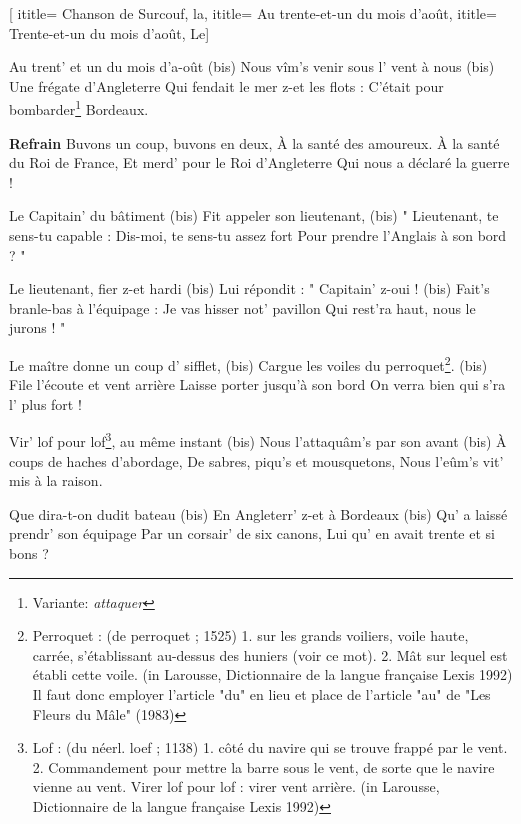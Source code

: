  [
ititle= {Chanson de Surcouf, la},
ititle= {Au trente-et-un du mois d'août},
ititle= {Trente-et-un du mois d'août, Le}]


\beginverse
Au trent' et un du mois d'a-oût (bis)
Nous vîm's venir sous l' vent à nous (bis)
Une frégate d'Angleterre
Qui fendait le mer z-et les flots :
C'était pour bombarder\footnote {Variante: \emph{attaquer}} Bordeaux.
\endverse

\beginchorus
\textbf {Refrain}
Buvons un coup, buvons en deux,
À la santé des amoureux.
À la santé du Roi de France,
Et merd' pour le Roi d'Angleterre
Qui nous a déclaré la guerre !
\endchorus

\beginverse
Le Capitain' du bâtiment (bis)
Fit appeler son lieutenant, (bis)
" Lieutenant, te sens-tu capable :
Dis-moi, te sens-tu assez fort
Pour prendre l'Anglais à son bord ? "
\endverse

\beginverse
Le lieutenant, fier z-et hardi (bis)
Lui répondit : " Capitain' z-oui ! (bis)
Fait's branle-bas à l'équipage :
Je vas hisser not' pavillon
Qui rest'ra haut, nous le jurons ! "
\endverse

\beginverse
Le maître donne un coup d' sifflet, (bis)
Cargue les voiles du perroquet\footnote {Perroquet : (de perroquet ; 1525) 1. sur les grands voiliers, voile haute, carrée, s'établissant au-dessus des huniers (voir ce mot). 2. Mât sur lequel est établi cette voile. (in Larousse, Dictionnaire de la langue
française Lexis 1992) Il faut donc employer l'article "du" en lieu et place de l'article "au" de "Les Fleurs du Mâle" (1983)}. (bis)
File l'écoute et vent arrière
Laisse porter jusqu'à son bord
On verra bien qui s'ra l' plus fort !
\endverse

\beginverse
Vir' lof pour lof\footnote {Lof : (du néerl. loef ; 1138) 1. côté du navire qui se trouve frappé par le vent. 2. Commandement pour mettre la barre sous le vent, de sorte que le navire vienne au vent. Virer lof pour lof : virer vent arrière. (in Larousse, Dictionnaire de la langue française Lexis 1992)}, au même instant (bis)
Nous l'attaquâm's par son avant (bis)
À coups de haches d'abordage,
De sabres, piqu's et mousquetons,
Nous l'eûm's vit' mis à la raison.
\endverse

\beginverse
Que dira-t-on dudit bateau (bis)
En Angleterr' z-et à Bordeaux (bis)
Qu' a laissé prendr' son équipage
Par un corsair' de six canons,
Lui qu' en avait trente et si bons ?
\endverse

\endsong